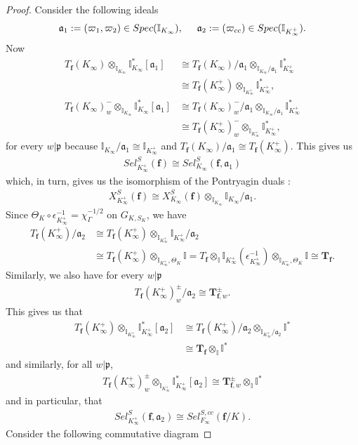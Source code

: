 \documentclass[reqno,10pt]{amsart}
\newcommand{\I}{\mathbb{I}}
\newcommand{\f}{\mathbf{f}}
\newcommand{\T}{\mathbf{T}}
\newcommand{\ma}{\mathfrak{a}}
\newcommand{\p}{\mathfrak{p}}
\newcommand{\kinf}{K_\infty}
\newcommand{\kip}{K_\infty^+}
\newcommand{\ikinf}{\I_{K_\infty}}
\newcommand{\ikip}{\I_{K_\infty^+}}
\newcommand{\vp}{\varpi}
\theoremstyle{plain}
\theoremstyle{definition}
\begin{document}
\begin{proof}
    Consider the following ideals
    \begin{align*}
        \ma_1 := (\vp_1,\vp_2) \in Spec(\I_{\kinf}), \hspace{5mm} \ma_2 := (\vp_{cc}) \in Spec(\ikip).
    \end{align*}
    Now
    \begin{align*}
         T_\f(\kinf) \otimes_{\ikinf} \ikinf^*[\ma_1] & \cong T_\f(\kinf)/\ma_1 \otimes_{\ikinf/\ma_1} \ikip^* \\ 
        & \cong T_\f(\kip) \otimes_{\ikip} \ikip^*, \\ 
        T_\f(\kinf)^-_w \otimes_{\ikinf} \ikinf^*[\ma_1] & \cong T_\f(\kinf)_w^-/\ma_1 \otimes_{\ikinf/\ma_1} \ikip^* \\ 
        & \cong T_\f(\kip)^-_w \otimes_{\ikip} \ikip^*,
    \end{align*}
    for every $w|\p$ because $\I_{\kinf}/\ma_1 \cong \I_{\kip}$ and $T_\f(\kinf)/\ma_1 \cong T_\f(\kip)$. This gives us
    \begin{align*}
        Sel^S_{\kip}(\f) \cong Sel^S_{\kinf}(\f,\ma_1)
    \end{align*}
    which, in turn, gives us the isomorphism of the Pontryagin duals :
    \begin{align*}
       X^S_{\kip}(\f) \cong X_{\kinf}^S(\f) \otimes_{\ikinf} \ikinf/\ma_1.
    \end{align*}
    Since $\Theta_K \circ \epsilon_{\kip}^{-1} = \chi_\Gamma^{-1/2}$ on $G_{K,S_K}$, we have
    \begin{align*}
        T_\f(\kip)/\ma_2 & \cong T_\f(\kip) \otimes_{\ikip} \ikip/\ma_2 \\
        & \cong T_\f(\kip) \otimes_{\ikip,\Theta_K} \I = T_\f \otimes_\I \ikip(\epsilon_{\kip}^{-1}) \otimes_{\ikip,\Theta_K} \I \cong \T_\f.
    \end{align*}
    Similarly, we also have for every $w|\p$
    \begin{align*}
        T_\f(\kip)^\pm_w/\ma_2 \cong \T_{\f,w}^\pm.
    \end{align*}
    This gives us that 
    \begin{align*}
        T_\f(\kip) \otimes_{\ikip} \ikip^*[\ma_2] & \cong T_\f(\kip)/\ma_2 \otimes_{\ikip/\ma_2} \I^* \\ 
        & \cong \T_\f \otimes_\I \I^*
    \end{align*}
    and similarly, for all $w|\p$,
    \begin{align*}
        T_\f(\kip)^\pm_w \otimes_{\ikip} \ikip^*[\ma_2] \cong \T_{\f,w}^\pm \otimes_\I \I^*
    \end{align*}
    and in particular, that
    \begin{align*}
        Sel_{\kip}^S(\f,\ma_2) \cong Sel_{F_\infty}^{S,cc}(\f/K).
    \end{align*}
    Consider the following commutative diagram


\end{proof}
\end{document}
